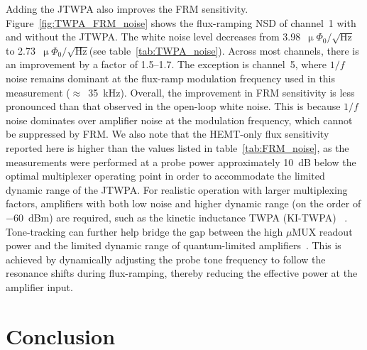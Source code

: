 \documentclass[
 prd,
 reprint,
 superscriptaddress,
 amsmath,amssymb,
 aps,
 floatfix,
]{revtex4-2}
\newcommand{\uMUX}{$\mu$MUX\xspace}
\newcommand{\uPhirtHz}{$\upmu \Phi_0/\sqrt{\text{Hz}}$\xspace}
\begin{document}
Adding the JTWPA also improves the FRM sensitivity. Figure~\ref{fig:TWPA_FRM_noise} shows the flux-ramping NSD of channel~1 with and without the JTWPA. The white noise level decreases from 3.98~\uPhirtHz to 2.73~\uPhirtHz (see table~\ref{tab:TWPA_noise}). Across most channels, there is an improvement by a factor of 1.5--1.7. The exception is channel~5, where $1/f$ noise remains dominant at the flux-ramp modulation frequency used in this measurement (\mbox{$\approx$~\qty{35}{\kHz}}). Overall, the improvement in FRM sensitivity is less pronounced than that observed in the open-loop white noise. This is because $1/f$ noise dominates over amplifier noise at the modulation frequency, which cannot be suppressed by FRM. We also note that the HEMT-only flux sensitivity reported here is higher than the values listed in table~\ref{tab:FRM_noise}, as the measurements were performed at a probe power approximately \qty{10}{\dB} below the optimal multiplexer operating point in order to accommodate the limited dynamic range of the JTWPA. For realistic operation with larger multiplexing factors, amplifiers with both low noise and higher dynamic range (on the order of \qty{-60}{dBm}) are required, such as the kinetic inductance TWPA (KI-TWPA) ~\cite{malnou_three-wave_2021, faramarzi_48_2024}. Tone-tracking can further help bridge the gap between the high \uMUX readout power and the limited dynamic range of quantum-limited amplifiers~\cite{yu_slac_2023, groh_demonstration_2025}. This is achieved by dynamically adjusting the probe tone frequency to follow the resonance shifts during flux-ramping, thereby reducing the effective power at the amplifier input.


\section{Conclusion}
\label{sec:conclusion}
\end{document}
